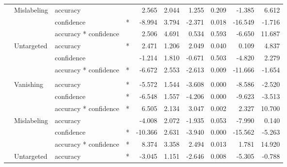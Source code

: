\begin{longtable}[t]{llllrrrrrr}
\hspace{1em} & Mislabeling & accuracy &  & 2.565 & 2.044 & 1.255 & 0.209 & -1.385 & 6.612\\
\cmidrule{3-10}\nopagebreak
\hspace{1em} &  & confidence & * & -8.994 & 3.794 & -2.371 & 0.018 & -16.549 & -1.716\\
\cmidrule{3-10}\nopagebreak
\hspace{1em} &  & accuracy * confidence &  & 2.506 & 4.691 & 0.534 & 0.593 & -6.650 & 11.687\\
\cmidrule{2-10}\nopagebreak
\hspace{1em} & Untargeted & accuracy & * & 2.471 & 1.206 & 2.049 & 0.040 & 0.109 & 4.837\\
\cmidrule{3-10}\nopagebreak
\hspace{1em} &  & confidence &  & -1.214 & 1.810 & -0.671 & 0.503 & -4.820 & 2.279\\
\cmidrule{3-10}\nopagebreak
\hspace{1em} &  & accuracy * confidence & * & -6.672 & 2.553 & -2.613 & 0.009 & -11.666 & -1.654\\
\cmidrule{1-10}\pagebreak[0]
\addlinespace[0.3em]
\multicolumn{10}{l}{\textbf{Faster R-CNN}}\\
\hspace{1em} & Vanishing & accuracy & * & -5.572 & 1.544 & -3.608 & 0.000 & -8.586 & -2.520\\
\cmidrule{3-10}\nopagebreak
\hspace{1em} &  & confidence & * & -6.548 & 1.557 & -4.206 & 0.000 & -9.623 & -3.513\\
\cmidrule{3-10}\nopagebreak
\hspace{1em} &  & accuracy * confidence & * & 6.505 & 2.134 & 3.047 & 0.002 & 2.327 & 10.700\\
\cmidrule{2-10}\nopagebreak
\hspace{1em} & Mislabeling & accuracy &  & -4.008 & 2.072 & -1.935 & 0.053 & -7.990 & 0.140\\
\cmidrule{3-10}\nopagebreak
\hspace{1em} &  & confidence & * & -10.366 & 2.631 & -3.940 & 0.000 & -15.562 & -5.263\\
\cmidrule{3-10}\nopagebreak
\hspace{1em} &  & accuracy * confidence & * & 8.374 & 3.358 & 2.494 & 0.013 & 1.781 & 14.920\\
\cmidrule{2-10}\nopagebreak
\hspace{1em} & Untargeted & accuracy & * & -3.045 & 1.151 & -2.646 & 0.008 & -5.305 & -0.788\\

\end{longtable}
